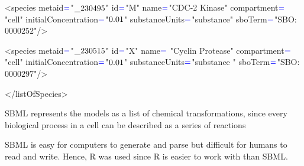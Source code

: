 \documentclass[portrait,a1paper,fontscale=0.49]{baposter}
\begin{document}
\begin{poster}
{\begin{flushleft}
{{ <\color{red}species metaid$\color{blue}=$\color{blue}"$\color{black}\_230495$\color{blue}" \color{red} id$\color{blue}=$\color{blue}"\color{black}M\color{blue}" \color{red} name$\color{blue}=$\color{blue}"\color{black}CDC-2 Kinase\color{blue}" \color{red} compartment$\color{blue}=$\color{blue}"\color{black}cell\color{blue}" \color{red} initialConcentration$\color{blue}=$\color{blue}"$\color{black}0.01$\color{blue}" \color{red} substanceUnits$\color{blue}=$\color{blue}"\color{black}substance\color{blue}" \color{red} sboTerm$\color{blue}=$\color{blue}"\color{black}SBO:$0000252$\color{blue}"/>
 
 <\color{red}species metaid$\color{blue}=$\color{blue}"$\color{black}\_230515$\color{blue}" \color{red} id$\color{blue}=$\color{blue}"\color{black}X\color{blue}" \color{red} name$ \color{blue}=$ \color{blue} "\color{black}Cyclin Protease\color{blue}" \color{red} compartment$\color{blue}=$\color{blue}"\color{black}cell\color{blue}" \color{red} initialConcentration$\color{blue}=$\color{blue}"$\color{black} 0.01$\color{blue}" \color{red} substanceUnits$\color{blue}=$\color{blue}"\color{black}substance \color{blue}" \color{red} sboTerm$\color{blue}=$\color{blue}"\color{black}SBO:$0000297$\color{blue}"/>
 
 <\color{red}/listOfSpecies\color{blue}>}}
 \end{flushleft}
 
 SBML represents the models as a list of chemical transformations, since every biological process in a cell can be described as a series of reactions
 
 SBML is easy for computers to generate and parse but difficult for humans to read and write. Hence, R was used since R is easier to work with than SBML. 
 }
 
\end{poster}
\end{document}
